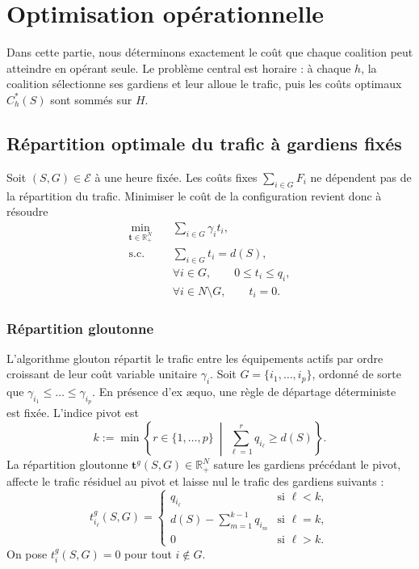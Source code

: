 \newpage

\section{Optimisation opérationnelle}

Dans cette partie, nous déterminons exactement
le coût que chaque coalition peut atteindre en opérant seule. Le problème
central est horaire : à chaque \(h\), la coalition sélectionne ses gardiens et
leur alloue le trafic, puis les coûts optimaux \(C_h^*(S)\) sont sommés sur
\(H\).

\subsection{Répartition optimale du trafic à gardiens fixés}
\label{subsec:allocation_gardiens_fixes}

Soit \((S,G)\in\mathcal E\) à une heure fixée. Les coûts fixes
\(\sum_{i\in G}F_i\) ne dépendent pas de la répartition du trafic. Minimiser
le coût de la configuration revient donc à résoudre
\begin{equation}
\label{eq:lp_allocation_fixe}
\begin{aligned}
    \min_{\mathbf{t}\in\mathbb R_+^N}\quad
        & \sum_{i\in G}\gamma_i t_i,\\
    \text{s.c.}\quad
        & \sum_{i\in G} t_i=d(S),\\
        & \forall i\in G,\qquad
        0\leqslant t_i\leqslant q_i,\\
        & \forall i\in N\setminus G,\qquad
        t_i=0.
\end{aligned}
\end{equation}

\subsubsection{Répartition gloutonne}

L'algorithme glouton répartit le trafic entre les équipements actifs par
ordre croissant de leur coût variable unitaire \(\gamma_i\). Soit
\(G=\{i_1,\dots,i_p\}\), ordonné de sorte que
\(\gamma_{i_1}\leqslant\dots\leqslant\gamma_{i_p}\). En présence d'ex æquo,
une règle de départage déterministe est fixée. L'indice pivot est
\[
k:=\min\left\{
r\in\{1,\dots,p\}\ \middle|\
\sum_{\ell=1}^{r}q_{i_\ell}\geqslant d(S)
\right\}.
\]
La répartition gloutonne
\(\mathbf t^g(S,G)\in\mathbb R_+^N\) sature les gardiens précédant
le pivot, affecte le trafic résiduel au pivot et laisse nul le trafic des
gardiens suivants :
\[
 t_{i_\ell}^g(S,G) =
\begin{cases}
q_{i_\ell} & \text{si } \ell < k,\\
d(S) - \sum_{m=1}^{k-1} q_{i_m} & \text{si } \ell = k,\\
0 & \text{si } \ell > k.
\end{cases}
\]
On pose \(t_i^g(S,G)=0\) pour tout \(i\notin G\).

